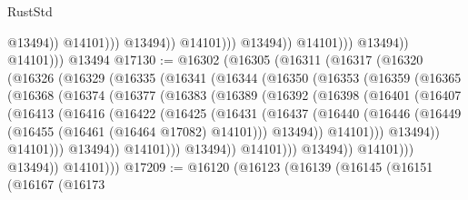 \begin{lexlean}{RustStd}
\begin{coremodule}
                                            @13494))
                                        @14101)))
                                  @13494))
                              @14101)))
                        @13494))
                    @14101)))
              @13494))
          @14101)))
    @13494
@17130 := @16302
    (@16305
      (@16311
        (@16317
          (@16320
            (@16326
              (@16329
                (@16335
                  (@16341
                    (@16344
                      (@16350
                        (@16353
                          (@16359
                            (@16365
                              (@16368
                                (@16374
                                  (@16377
                                    (@16383
                                      (@16389
                                        (@16392
                                          (@16398
                                            (@16401
                                              (@16407
                                                (@16413
                                                  (@16416
                                                    (@16422
                                                      (@16425
                                                        (@16431
                                                          (@16437
                                                            (@16440
                                                              (@16446
                                                                (@16449
                                                                  (@16455
                                                                    (@16461
                                                                      (@16464 @17082)
                                                                      @14101)))
                                                                @13494))
                                                            @14101)))
                                                      @13494))
                                                  @14101)))
                                            @13494))
                                        @14101)))
                                  @13494))
                              @14101)))
                        @13494))
                    @14101)))
              @13494))
          @14101)))
@17209 := @16120
    (@16123
      (@16139
        (@16145
          (@16151
            (@16167
              (@16173

\end{coremodule}
\end{lexlean}
